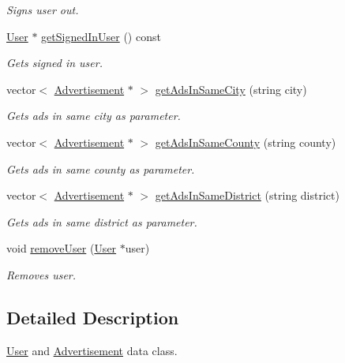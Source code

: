 \begin{DoxyCompactItemize}
\begin{DoxyCompactList}\small\item\em Signs user out. \end{DoxyCompactList}\item 
\hyperlink{class_user}{User} $\ast$ \hyperlink{class_data_a2e6708aea5868f9cda03563018e530bd}{get\+Signed\+In\+User} () const 
\begin{DoxyCompactList}\small\item\em Gets signed in user. \end{DoxyCompactList}\item 
vector$<$ \hyperlink{class_advertisement}{Advertisement} $\ast$ $>$ \hyperlink{class_data_afd47f962d9f835cd66905fcafd1a0af7}{get\+Ads\+In\+Same\+City} (string city)
\begin{DoxyCompactList}\small\item\em Gets ads in same city as parameter. \end{DoxyCompactList}\item 
vector$<$ \hyperlink{class_advertisement}{Advertisement} $\ast$ $>$ \hyperlink{class_data_aaee3cddf7c073f9e2aa9f84e13b03ba8}{get\+Ads\+In\+Same\+County} (string county)
\begin{DoxyCompactList}\small\item\em Gets ads in same county as parameter. \end{DoxyCompactList}\item 
vector$<$ \hyperlink{class_advertisement}{Advertisement} $\ast$ $>$ \hyperlink{class_data_af31d6cf3249bfdff2f4ab4ed8d2676c5}{get\+Ads\+In\+Same\+District} (string district)
\begin{DoxyCompactList}\small\item\em Gets ads in same district as parameter. \end{DoxyCompactList}\item 
void \hyperlink{class_data_aae526c8adaee61fa6ccad0a2d53cc3d1}{remove\+User} (\hyperlink{class_user}{User} $\ast$user)
\begin{DoxyCompactList}\small\item\em Removes user. \end{DoxyCompactList}\end{DoxyCompactItemize}


\subsection{Detailed Description}
\hyperlink{class_user}{User} and \hyperlink{class_advertisement}{Advertisement} data class. 


